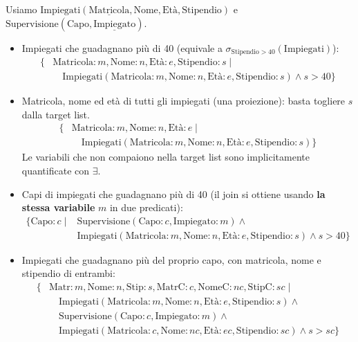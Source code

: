 \documentclass[12pt]{extarticle}
\begin{document}
\medskip
\noindent Usiamo $\text{Impiegati}(\underline{\text{Matricola}}, \text{Nome}, \text{Età}, \text{Stipendio})$ e $\text{Supervisione}(\text{Capo}, \underline{\text{Impiegato}})$.
\begin{itemize}
    \item Impiegati che guadagnano più di 40 (equivale a $\sigma_{\text{Stipendio} > 40}(\text{Impiegati})$):
    \[
    \begin{aligned}
    \{ & \text{Matricola}: m, \text{Nome}: n, \text{Età}: e, \text{Stipendio}: s \mid \\
    & \quad \text{Impiegati}(\text{Matricola}: m, \text{Nome}: n, \text{Età}: e, \text{Stipendio}: s) \wedge s > 40 \}
    \end{aligned}
    \]
    \item Matricola, nome ed età di tutti gli impiegati (una proiezione): basta togliere $s$ dalla target list.
    \[
    \begin{aligned}
    \{ & \text{Matricola}: m, \text{Nome}: n, \text{Età}: e \mid \\
    & \quad \text{Impiegati}(\text{Matricola}: m, \text{Nome}: n, \text{Età}: e, \text{Stipendio}: s) \}
    \end{aligned}
    \]
    Le variabili che non compaiono nella target list sono implicitamente quantificate con $\exists$.
    \item Capi di impiegati che guadagnano più di 40 (il join si ottiene usando \textbf{la stessa variabile} $m$ in due predicati):
    \[
    \begin{aligned}
    \{ \text{Capo}: c \mid {} & \text{Supervisione}(\text{Capo}: c, \text{Impiegato}: m) \wedge {} \\
    & \text{Impiegati}(\text{Matricola}: m, \text{Nome}: n, \text{Età}: e, \text{Stipendio}: s) \wedge s > 40 \}
    \end{aligned}
    \]
    \item Impiegati che guadagnano più del proprio capo, con matricola, nome e stipendio di entrambi:
    \[
    \begin{aligned}
    \{ & \text{Matr}: m, \text{Nome}: n, \text{Stip}: s, \text{MatrC}: c, \text{NomeC}: nc, \text{StipC}: sc \mid \\
    & \quad \text{Impiegati}(\text{Matricola}: m, \text{Nome}: n, \text{Età}: e, \text{Stipendio}: s) \wedge {} \\
    & \quad \text{Supervisione}(\text{Capo}: c, \text{Impiegato}: m) \wedge {} \\
    & \quad \text{Impiegati}(\text{Matricola}: c, \text{Nome}: nc, \text{Età}: ec, \text{Stipendio}: sc) \wedge s > sc \}

\end{aligned}\]
\end{itemize}
\end{document}

